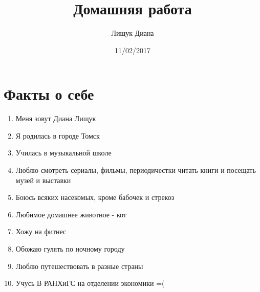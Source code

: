 \documentclass[12pt, a4paper]{article}
\author{Лищук Диана}
\title{Домашняя работа}
\date{11/02/2017}
\begin{document}
\maketitle 

\section{Факты о себе}
\begin{enumerate}
\item Меня зовут Диана Лищук
\item Я родилась в городе Томск
\item Училась в музыкальной школе
\item Люблю смотреть сериалы, фильмы, периодичестки читать книги и посещать музей и выставки
\item Боюсь всяких насекомых, кроме бабочек и стрекоз
\item Любимое домашнее животное - кот
\item Хожу на фитнес
\item Обожаю гулять по ночному городу
\item Люблю путешествовать в разные страны
\item Учусь В РАНХиГС на отделении экономики =(
\end{enumerate}
 
\end{document}
